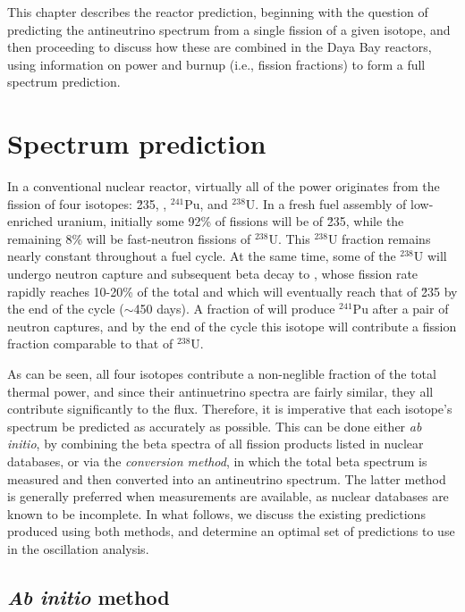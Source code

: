 \documentclass[../thesis.tex]{subfiles}
\begin{document}
This chapter describes the reactor prediction, beginning with the question of predicting the antineutrino spectrum from a single fission of a given isotope, and then proceeding to discuss how these are combined in the Daya Bay reactors, using information on power and burnup (i.e., fission fractions) to form a full spectrum prediction.

\section{Spectrum prediction}
\label{sec:specpred}

\def\u235{$^{235}$U}
\def\pu239{$^{239}$Pu}
\def\pu241{$^{241}$Pu}
\def\u238{$^{238}$U}

In a conventional nuclear reactor, virtually all of the power originates from the fission of four isotopes: \u235, , \pu241, and \u238. In a fresh fuel assembly of low-enriched uranium, initially some 92\% of fissions will be of \u235, while the remaining 8\% will be fast-neutron fissions of \u238. This \u238 fraction remains nearly constant throughout a fuel cycle. At the same time, some of the \u238 will undergo neutron capture and subsequent beta decay to , whose fission rate rapidly reaches 10-20\% of the total and which will eventually reach that of \u235 by the end of the cycle ($\sim$450 days). A fraction of  will produce \pu241 after a pair of neutron captures, and by the end of the cycle this isotope will contribute a fission fraction comparable to that of \u238.

As can be seen, all four isotopes contribute a non-neglible fraction of the total thermal power, and since their antinuetrino spectra are fairly similar, they all contribute significantly to the flux. Therefore, it is imperative that each isotope's spectrum be predicted as accurately as possible. This can be done either \emph{ab initio}, by combining the beta spectra of all fission products listed in nuclear databases, or via the \emph{conversion method}, in which the total beta spectrum is measured and then converted into an antineutrino spectrum. The latter method is generally preferred when measurements are available, as nuclear databases are known to be incomplete. In what follows, we discuss the existing predictions produced using both methods, and determine an optimal set of predictions to use in the oscillation analysis.

\subsection{\textit{Ab initio} method}
\label{sec:abinitio}
\end{document}
